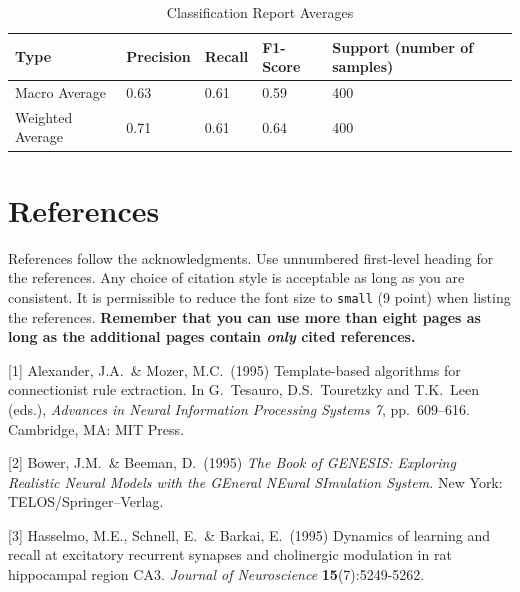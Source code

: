 \documentclass{article}
\begin{document}
\begin{table}[h]
  \caption{Classification Report Averages}
  \centering
  \begin{tabular}{l | l l l l}
    Type & Precision & Recall & F1-Score & Support (number of samples) \\
    \midrule
		Macro Average & 0.63 & 0.61 & 0.59 & 400 \\
		Weighted Average & 0.71 & 0.61 & 0.64 & 400 \\
    \bottomrule
  \end{tabular}
\end{table}

\section*{References}

References follow the acknowledgments. Use unnumbered first-level heading for
the references. Any choice of citation style is acceptable as long as you are
consistent. It is permissible to reduce the font size to \verb+small+ (9 point)
when listing the references. {\bf Remember that you can use more than eight
  pages as long as the additional pages contain \emph{only} cited references.}
\medskip

\small

[1] Alexander, J.A.\ \& Mozer, M.C.\ (1995) Template-based algorithms for
connectionist rule extraction. In G.\ Tesauro, D.S.\ Touretzky and T.K.\ Leen
(eds.), {\it Advances in Neural Information Processing Systems 7},
pp.\ 609--616. Cambridge, MA: MIT Press.

[2] Bower, J.M.\ \& Beeman, D.\ (1995) {\it The Book of GENESIS: Exploring
  Realistic Neural Models with the GEneral NEural SImulation System.}  New York:
TELOS/Springer--Verlag.

[3] Hasselmo, M.E., Schnell, E.\ \& Barkai, E.\ (1995) Dynamics of learning and
recall at excitatory recurrent synapses and cholinergic modulation in rat
hippocampal region CA3. {\it Journal of Neuroscience} {\bf 15}(7):5249-5262.
\end{document}

